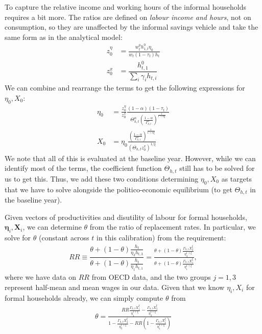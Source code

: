 \documentclass[a4paper]{article}
\begin{document}
To capture the relative income and working hours of the informal households requires a bit more. The ratios are defined on \emph{labour income and hours}, not on consumption, so they are unaffected by the informal savings vehicle and take the same form as in the analytical model:
\begin{align*}
    z_0^{\eta} &= \frac{w_t^0h_{1,t}^0\eta_{0}}{w_t(1-\tau_t)h_t} \\
    z_0^x &= \dfrac{h_{t,1}^0}{\sum_i \gamma_{i} h_{t,i}}
\end{align*}
We can combine and rearrange the terms to get the following expressions for $\eta_0, X_0$:
\begin{align}
    \eta_{0} &= \frac{z_0^{\eta}}{z_0^x}\frac{(1-\alpha)(1-\tau_t)}{\Theta_{h,t}^{\alpha}\left(\frac{1-\alpha}{\Gamma_{h,t}^{\alpha}}\right)^{\frac{1}{1+\alpha\xi}}} \label{\refeq:calibration:eta0}\\
    X_{0} &= \eta_{0}\frac{\left(\frac{1-\alpha}{\Gamma_{h,t}^{\alpha}}\right)^{\frac{1}{1+\alpha\xi}}}{\left(\Theta_{h,t}z_0^x\right)^{1/\xi}} \label{\refeq:calibration:X0}
\end{align}
We note that all of this is evaluated at the baseline year. However, while we can identify most of the terms, the coefficient function $\Theta_{h,t}$ still has to be solved for us to get this. Thus, we add these two conditions determining $\eta_0, X_0$ as targets that we have to solve alongside the politico-economic equilibrium (to get $\Theta_{h,t}$ in the baseline year).


Given vectors of productivities and disutility of labour for formal households, $\bm{\eta}_i, \bm{X}_i$, we can determine $\theta$ from the ratio of replacement rates. In particular, we solve for $\theta$ (constant across $t$ in this calibration) from the requirement:
 \begin{align*}
        RR \equiv \dfrac{\theta+(1-\theta)\frac{h_t}{\eta_3 h_{t,3}}}{\theta+(1-\theta)\frac{h_t}{\eta_1 h_{t,1}}} = \frac{\theta + (1-\theta)\frac{\Gamma_{h,t} X_3^{\xi}}{\eta_3^{1+\xi}}}{\theta+(1-\theta)\frac{\Gamma_{h,t} X_1^{\xi}}{\eta_1^{1+\xi}}},
\end{align*}
where we have data on $RR$ from OECD data, and the two groups $j=1, 3$ represent half-mean and mean wages in our data. Given that we know $\eta_i, X_i$ for formal households already, we can simply compute $\theta$ from
\begin{align}
    \theta = \frac{RR \frac{\Gamma_{h,t} X_1^{\xi}}{\eta_1^{1+\xi}} - \frac{\Gamma_{h,t} X_3^{\xi}}{\eta_3^{1+\xi}}}{1-\frac{\Gamma_{h,t} X_3^{\xi}}{\eta_3^{1+\xi}}-RR\left(1-\frac{\Gamma_{h,t} X_1^{\xi}}{\eta_1^{1+\xi}}\right)}
\end{align}
\end{document}
